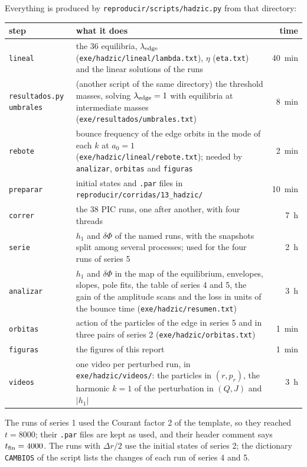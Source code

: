 \documentclass[11pt,a4paper]{article}
\begin{document}
Everything is produced by \texttt{reproducir/scripts/hadzic.py} from that directory:
\begin{center}
\small
\begin{tabular}{lL{9.5cm}r}
\toprule
step & what it does & time\\
\midrule
\texttt{lineal} & the 36 equilibria, $\lambda_{\rm edge}$ (\texttt{exe/hadzic/lineal/lambda.txt}), $\eta$ (\texttt{eta.txt}) and the linear solutions of the runs & \SI{40}{min}\\
\texttt{resultados.py umbrales} & (another script of the same directory) the threshold masses, solving $\lambda_{\rm edge}=1$ with equilibria at intermediate masses (\texttt{exe/resultados/umbrales.txt}) & \SI{8}{min}\\
\texttt{rebote} & bounce frequency of the edge orbits in the mode of each $k$ at $a_0=1$ (\texttt{exe/hadzic/lineal/rebote.txt}); needed by \texttt{analizar}, \texttt{orbitas} and \texttt{figuras} & \SI{2}{min}\\
\texttt{preparar} & initial states and \texttt{.par} files in \texttt{reproducir/corridas/13\_hadzic/} & \SI{10}{min}\\
\texttt{correr} & the 38 PIC runs, one after another, with four threads & \SI{7}{h}\\
\texttt{serie} & $h_1$ and $\delta\Phi$ of the named runs, with the snapshots split among several processes; used for the four runs of series 5 & \SI{2}{h}\\
\texttt{analizar} & $h_1$ and $\delta\Phi$ in the map of the equilibrium, envelopes, slopes, pole fits, the table of series 4 and 5, the gain of the amplitude scans and the loss in units of the bounce time (\texttt{exe/hadzic/resumen.txt}) & \SI{3}{h}\\
\texttt{orbitas} & action of the particles of the edge in series 5 and in three pairs of series 2 (\texttt{exe/hadzic/orbitas.txt}) & \SI{1}{min}\\
\texttt{figuras} & the figures of this report & \SI{1}{min}\\
\texttt{videos} & one video per perturbed run, in \texttt{exe/hadzic/videos/}: the particles in $(r,p_r)$, the harmonic $k=1$ of the perturbation in $(Q,J)$ and $|h_1|$ & \SI{3}{h}\\
\bottomrule
\end{tabular}
\end{center}
The runs of series 1 used the Courant factor 2 of the template, so they reached $t=8000$;
their \texttt{.par} files are kept as used, and their header comment says $t_{\rm fin}=4000$.
The runs with $\Delta r/2$ use the initial states of series 2; the dictionary \texttt{CAMBIOS} of the
script lists the changes of each run of series 4 and 5.
\end{document}
